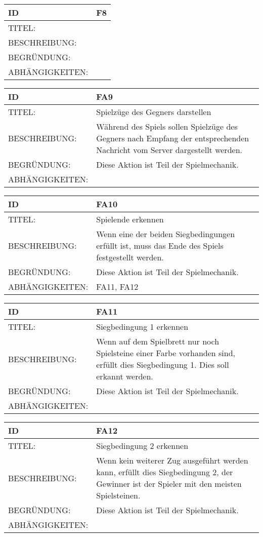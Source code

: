 \documentclass{uulm-assignment}
\begin{document}
\begin{tabularx}{16cm}{l|X}
\textbf{ID} & \textbf{F8} \\
\hline
TITEL: & \\
\hline
BESCHREIBUNG: & 
\\
\hline
BEGRÜNDUNG: &\\
\hline
ABHÄNGIGKEITEN: & \\
\end{tabularx}


\begin{tabularx}{16cm}{l|X}
\textbf{ID} & \textbf{FA9} \\
\hline
TITEL: & Spielzüge des Gegners darstellen \\
\hline
BESCHREIBUNG: & Während des Spiels sollen Spielzüge des Gegners nach Empfang der entsprechenden Nachricht vom Server dargestellt werden.
\\
\hline
BEGRÜNDUNG: & Diese Aktion ist Teil der Spielmechanik. \\
\hline
ABHÄNGIGKEITEN: & \\
\end{tabularx}

\begin{tabularx}{16cm}{l|X}
\textbf{ID} & \textbf{FA10} \\
\hline
TITEL: & Spielende erkennen \\
\hline
BESCHREIBUNG: & Wenn eine der beiden Siegbedingungen erfüllt ist, muss das Ende des Spiels festgestellt werden.
\\
\hline
BEGRÜNDUNG: & Diese Aktion ist Teil der Spielmechanik. \\
\hline
ABHÄNGIGKEITEN: & FA11, FA12\\
\end{tabularx}

\begin{tabularx}{16cm}{l|X}
\textbf{ID} & \textbf{FA11} \\
\hline
TITEL: & Siegbedingung 1 erkennen \\
\hline
BESCHREIBUNG: & Wenn auf dem Spielbrett nur noch Spielsteine einer Farbe vorhanden sind, erfüllt dies Siegbedingung 1. Dies soll erkannt werden.
\\
\hline
BEGRÜNDUNG: & Diese Aktion ist Teil der Spielmechanik. \\
\hline
ABHÄNGIGKEITEN: & \\
\end{tabularx}


\begin{tabularx}{16cm}{l|X}
\textbf{ID} & \textbf{FA12} \\
\hline
TITEL: & Siegbedingung 2 erkennen \\
\hline
BESCHREIBUNG: & Wenn kein weiterer Zug ausgeführt werden kann, erfüllt dies Siegbedingung 2, der Gewinner ist der Spieler mit den meisten Spielsteinen.
\\
\hline
BEGRÜNDUNG: & Diese Aktion ist Teil der Spielmechanik. \\
\hline
ABHÄNGIGKEITEN: & \\
\end{tabularx}
\end{document}
